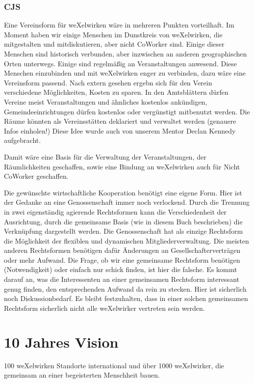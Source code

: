       \subsubsection{CJS}
Eine Vereinsform für weXelwirken wäre in mehreren Punkten vorteilhaft.
%
Im Moment haben wir einige Menschen im Dunstkreis von weXelwirken, die mitgestalten und mitdiskutieren, aber nicht CoWorker sind.
%
Einige dieser Menschen sind historisch verbunden, aber inzwischen an anderen geographischen Orten unterwegs.
%
Einige sind regelmäßig an Veranstaltungen anwesend.
%
Diese Menschen einzubinden und mit weXelwirken enger zu verbinden, dazu wäre eine Vereinsform passend.
%
Nach extern gesehen ergebn sich für den Verein verschiedene Möglichkeiten, Kosten zu sparen.
%
In den Amtsblättern dürfen Vereine meist Veranstaltungen und ähnliches kostenlos ankündigen, Gemeindeeinrichtungen dürfen kostenlos oder vergünstigt mitbenutzt werden.
%
Die Räume könnten als Vereinsstätten deklariert und verwaltet werden (genauere Infos einholen!)
%
Diese Idee wurde auch von unserem Mentor Declan Kennedy aufgebracht.



Damit wäre eine Basis für die Verwaltung der Veranstaltungen, der Räumlichkeiten geschaffen, sowie eine Bindung an weXelwirken auch für Nicht CoWorker geschaffen.



Die gewünschte wirtschaftliche Kooperation benötigt eine eigene Form.
%
Hier ist der Gedanke an eine Genossenschaft immer noch verlockend.
%
Durch die Trennung in zwei eigenständig agierende Rechtsformen kann die Verschiedenheit der Ausrichtung, durch die gemeinsame Basis (wie in diesem Buch beschrieben) die Verknüpfung dargestellt werden.
%
Die Genossenschaft hat als einzige Rechtsform die Möglichkeit der flexiblen und dynamischen Mitgliederverwaltung.
%
Die meisten anderen Rechtsformen benötigen dafür Änderungen an Gesellschafterverträgen oder mehr Aufwand.
%
Die Frage, ob wir eine gemeinsame Rechtsform benötigen (Notwendigkeit) oder einfach nur schick finden, ist hier die falsche.
%
Es kommt darauf an, was die Interessenten an einer gemeinsamen Rechtsform interessant genug finden, den entsprechenden Aufwand da rein zu stecken.
%
Hier ist sicherlich noch Diskussionbedarf.
%
Es bleibt festzuhalten, dass in einer solchen gemeinsamen Rechtsform sicherlich nicht alle weXelwirker vertreten sein werden.
  \section{10 Jahres Vision}
100 weXelwirken Standorte international und über 1000 weXelwirker, die gemeinsam an einer begeisterten Menschheit bauen.
